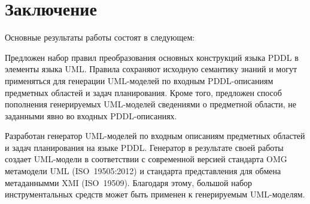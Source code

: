 \chapter*{Заключение}

Основные результаты работы состоят в следующем:





Предложен набор правил преобразования основных конструкций языка PDDL в элементы языка UML. Правила сохраняют исходную семантику знаний и могут применяться для генерации UML-моделей по входным PDDL-описаниям предметных областей и задач планирования. Кроме того, предложен способ пополнения генерируемых UML-моделей сведениями о предметной области, не заданными явно во входных PDDL-описаниях.

Разработан генератор UML-моделей по входным описаниям предметных областей и задач планирования на языке PDDL. Генератор в результате своей работы создает UML-модели в соответствии с современной версией стандарта OMG метамодели UML (ISO~19505:2012) и стандарта представления для обмена метаданнымми XMI (ISO~19509). Благодаря этому, большой набор инструментальных средств может быть применен к генерируемым UML-моделям.

\newpage
